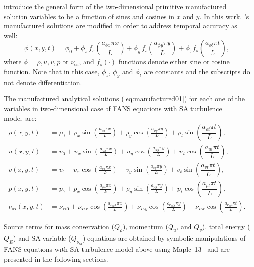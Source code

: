 \documentclass[10pt]{article}
\newcommand{\sa}{\nu_{\mathrm{sa}}}
\newcommand{\tsa}{\mathrm{sa}}
\begin{document}
\citet{Roy2002} introduce the general form of the two-dimensional primitive manufactured solution variables to be  a function of sines and cosines in $x$ and $y$. In this work, \citet{Roy2002}'s manufactured solutions are modified in order to address temporal accuracy as well:
\begin{equation}
 \label{eq:manufactured01}
  \phi (x,y,t) = \phi_0+ \phi_x\, f_s \left(\frac{a_{\phi x} \pi x}{L} \right) +  \phi_y \,f_s\left(\frac{a_{\phi y} \pi y}{L}\right) + \phi_t \,f_s\left(\frac{a_{\phi t} \pi t}{L}\right),
\end{equation}
where $\phi=\rho,u,v,p$ or $\sa$, and $f_s(\cdot)$ functions denote either sine or cosine function. Note that in this case, $\phi_x$, $\phi_y$  and $\phi_t$ are constants  and the subscripts do not denote differentiation.

The manufactured analytical solutions (\ref{eq:manufactured01}) for each one of the variables in two-dimensional case of FANS equations with SA turbulence model~are:
 \begin{equation}
 \begin{split}
\label{eq:manufactured_2d}
\rho\left(x,y,t\right) &=  \rho_{0}+ \rho_{x} \sin\left(\frac{a_{ \rho x} \pi x}{L}\right)+ \rho_{y} \cos\left(\frac{a_{ \rho y} \pi y}{L}\right)+ \rho_t \sin\left(\dfrac{a_{\rho t} \pi t}{L}\right),\\
u\left(x,y,t\right) &= u_{0}+u_{x} \sin\left(\frac{a_{u x} \pi x}{L}\right)+u_{y} \cos\left(\frac{a_{u y} \pi y}{L}\right) + u_t \cos\left(\dfrac{a_{u t} \pi t}{L}\right),\\
v\left(x,y,t\right) &= v_{0}+v_{x} \cos\left(\frac{a_{v x} \pi x}{L}\right)+v_{y} \sin\left(\frac{a_{v y} \pi y}{L}\right)+ v_t \sin\left(\dfrac{a_{v t} \pi t}{L}\right),\\
p\left(x,y,t\right) &= p_{0}+p_{x} \cos\left(\frac{a_{p x} \pi x}{L}\right)+p_{y} \sin\left(\frac{a_{p y} \pi y}{L}\right)+ p_t \cos\left(\dfrac{a_{p t} \pi t}{L}\right),\\
\sa(x,y,t) &= \nu_{\tsa 0} +\nu_{\tsa x} \cos\left(\frac{a_{\sa x} \pi x}{L}\right) + \nu_{\tsa y} \cos\left(\frac{a_{\sa y} \pi y}{L}\right) + \nu_{\tsa t}\cos\left(\frac{a_{\sa t} \pi t}{L}\right).
\end{split}
\end{equation}

Source terms  for mass conservation ($Q_\rho$), momentum ($Q_u$, and $Q_v$), total energy ($Q_{E}$) and SA variable ($Q_{\sa}$) equations are obtained by symbolic manipulations of FANS equations with SA turbulence model above using Maple~13~\citep{Maple} and are presented in the following sections.
\end{document}
